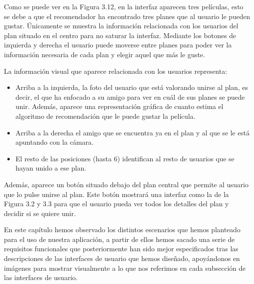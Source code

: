 \begin{flushleft}
Como se puede ver en la Figura 3.12, en la interfaz aparecen tres películas, esto se debe a que el recomendador ha encontrado tres planes que al usuario le pueden gustar. Únicamente se muestra la 
información relacionada con los usuarios del plan situado en el centro para no saturar la interfaz. Mediante los 
botones de izquierda y derecha el usuario puede moverse entre planes para poder ver la información necesaria 
de cada plan y elegir aquel que más le guste.
\end{flushleft}
\begin{flushleft}
La información visual que aparece relacionada con los usuarios representa:
\begin{itemize}
    \item Arriba a la izquierda, la foto del usuario que está valorando unirse al plan, es decir, el que ha enfocado a su amigo para ver en cuál de sus planes se puede unir. Además, aparece una representación 
    gráfica de cuanto estima el algoritmo de recomendación que le puede gustar la película.
    \item Arriba a la derecha el amigo que se encuentra ya en el plan y al que se le está apuntando con la cámara.
    \item El resto de las posiciones (hasta 6) identifican al resto de usuarios que se hayan unido a ese plan.
\end{itemize}
Además, aparece un botón situado debajo del plan central que permite al usuario que lo pulse unirse al 
plan. Este botón mostrará una interfaz como la de la Figura 3.2 y 3.3 para que el usuario pueda ver todos 
los detalles del plan y decidir si se quiere unir.
\end{flushleft}

\begin{flushleft}
     En este capítulo hemos observado los distintos escenarios que hemos planteado para el uso de nuestra aplicación, a partir de ellos hemos sacado una serie de 
     requisitos funcionales que posteriormente han sido mejor especificados tras las descripciones de las interfaces de usuario que hemos diseñado, apoyándonos en imágenes 
     para mostrar visualmente a lo que nos referimos en cada subsección de las interfaces de usuario.
\end{flushleft}





